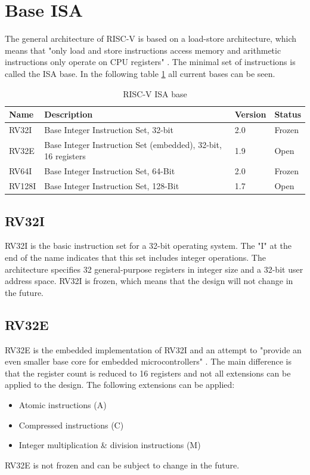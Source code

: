 \section{Base ISA}
The general architecture of RISC-V is based on a
load-store architecture, which means that "only load
and store instructions access memory and arithmetic 
instructions only operate on CPU registers" 
\cite[p.~18]{risc-v_isa_manual_user_level}.
The minimal set of instructions is called the ISA base.
In the following table \ref{tab:risc-v_isa_base} all current bases can be seen.
\begin{table}[htb]
    \centering
    \begin{tabular}{|l|l|l|l|}
        \hline
        Name & Description & Version & Status \\ \hline
        RV32I & Base Integer Instruction Set, 32-bit & 2.0 & Frozen \\ \hline
        RV32E & Base Integer Instruction Set (embedded), 32-bit, 16 registers
            & 1.9 & Open \\ \hline
        RV64I & Base Integer Instruction Set, 64-Bit & 2.0 & Frozen\\ \hline
        RV128I & Base Integer Instruction Set, 128-Bit & 1.7 & Open\\ 
        \hline
    \end{tabular}
    \caption{RISC-V ISA base \cite[p.~i~\&~v-vi]{risc-v_isa_manual_user_level}}
    \label{tab:risc-v_isa_base}
\end{table}

\subsection{RV32I}
RV32I is the basic instruction set for a 32-bit operating system.
The "I" at the end of the name indicates that this set includes
integer operations. The architecture specifies 32 general-purpose
registers in integer size and a 32-bit user address space.
RV32I is frozen, which means that the design will not change in
the future.

\subsection{RV32E}
RV32E is the embedded implementation of RV32I and an attempt to
"provide an even smaller base core for embedded microcontrollers"
\cite[p.~27]{risc-v_isa_manual_user_level}. The main difference
is that the register count is reduced to 16 registers and not all
extensions can be applied to the design. The following extensions
can be applied:
\begin{itemize}
    \item Atomic instructions (A)
    \item Compressed instructions (C)
    \item Integer multiplication \& division instructions (M)
\end{itemize}
RV32E is not frozen and can be subject to change in the future.

